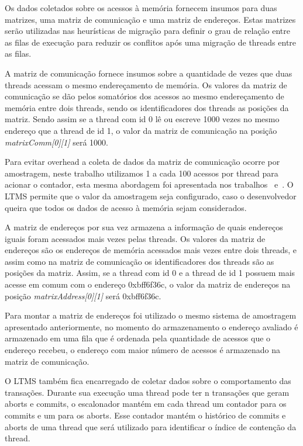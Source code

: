 \documentclass[diss,capa]{texufpel}
\begin{document}
Os dados coletados sobre os acessos à memória fornecem insumos para duas matrizes, uma matriz de comunicação e uma matriz de endereços. Estas matrizes serão utilizadas nas heurísticas de migração para definir o grau de relação entre as filas de execução para reduzir os conflitos após uma migração de threads entre as filas.

A matriz de comunicação fornece insumos sobre a quantidade de vezes que duas threads acessam o mesmo endereçamento de memória. Os valores da matriz de comunicação se dão pelos somatórios dos acessos ao mesmo endereçamento de memória entre dois threads, sendo os identificadores dos threads as posições da matriz. Sendo assim se a thread com id 0 lê ou escreve 1000 vezes no mesmo endereço que a thread de id 1, o valor da matriz de comunicação na posição \emph{matrixComm[0][1]} será 1000.

Para evitar overhead a coleta de dados da matriz de comunicação ocorre por amostragem, neste trabalho utilizamos 1 a cada 100 acessos por thread para acionar o contador, esta mesma abordagem foi apresentada nos trabalhos~\cite{pasqualin2020online} e~\cite{pasqualin2020thread}. O LTMS permite que o valor da amostragem seja configurado, caso o desenvolvedor queira que todos os dados de acesso à memória sejam considerados.

A matriz de endereços por sua vez armazena a informação de quais endereços iguais foram acessados mais vezes pelas threads. Os valores da matriz de endereços são os endereços de memória acessados mais vezes entre dois threads, e assim como na matriz de comunicação os identificadores dos threads são as posições da matriz. Assim, se a thread com id 0 e a thread de id 1 possuem mais acesse em comum com o endereço 0xbff6f36c, o valor da matriz de endereços na posição \emph{matrixAddress[0][1]} será 0xbff6f36c.

Para montar a matriz de endereços foi utilizado o mesmo sistema de amostragem apresentado anteriormente, no momento do armazenamento o endereço avaliado é armazenado em uma fila que é ordenada pela quantidade de acessos que o endereço recebeu, o endereço com maior número de acessos é armazenado na matriz de comunicação.

O LTMS também fica encarregado de coletar dados sobre o comportamento das transações. Durante sua execução uma thread pode ter n transações que geram aborts e commits, o escalonador mantém em cada thread um contador para os commits e um para os aborts. Esse contador mantém o histórico de commits e aborts de uma thread que será utilizado para identificar o índice de contenção da thread.
\end{document}
